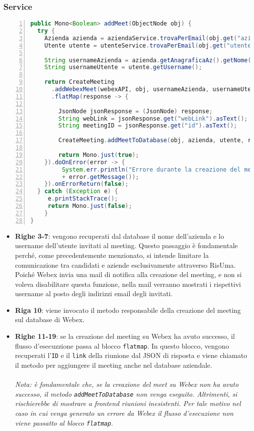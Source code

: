 \subsubsection{Service}
\begin{lstlisting}[language=java, frame=lines, basicstyle=\ttfamily\scriptsize, numbers=left]
public Mono<Boolean> addMeet(ObjectNode obj) {
  try {
    Azienda azienda = aziendaService.trovaPerEmail(obj.get("azienda").asText());
    Utente utente = utenteService.trovaPerEmail(obj.get("utente").asText());

    String usernameAzienda = azienda.getAnagraficaAz().getNome();
    String usernameUtente = utente.getUsername();

    return CreateMeeting
      .addWebexMeet(webexAPI, obj, usernameAzienda, usernameUtente)
      .flatMap(response -> {

	    JsonNode jsonResponse = (JsonNode) response;
	    String webLink = jsonResponse.get("webLink").asText();
	    String meetingID = jsonResponse.get("id").asText();

	    CreateMeeting.addMeetToDatabase(obj, azienda, utente, repo, webLink, meetingID);

	    return Mono.just(true);
    }).doOnError(error -> {
         System.err.println("Errore durante la creazione del meeting su Webex: "
         + error.getMessage());
    }).onErrorReturn(false);
  } catch (Exception e) {
     e.printStackTrace();
     return Mono.just(false);
    }
}
\end{lstlisting}
\begin{itemize}
    \item \textbf{Righe 3-7}: vengono recuperati dal database il nome dell'azienda e lo username dell'utente invitati al meeting. 
    Questo passaggio è fondamentale perché, come precedentemente menzionato, si intende limitare la comunicazione tra candidati 
    e aziende esclusivamente attraverso RisUma. Poiché Webex invia una mail di notifica alla creazione del meeting, e non si voleva
    disabilitare questa funzione, nella mail verranno mostrati i rispettivi username al posto degli indirizzi email degli invitati.

    \item \textbf{Riga 10}: viene invocato il metodo responsabile della creazione del meeting sul database di Webex.

    \item \textbf{Righe 11-19}: se la creazione del meeting su Webex ha avuto successo, il flusso d'esecuzzione passa al 
    blocco \texttt{flatmap}. In questo blocco, vengono recuperati l'\texttt{ID} e il \texttt{link} della riunione dal JSON di risposta 
    e viene chiamato il metodo per aggiungere il meeting anche nel database aziendale.
    \\
    \\
    \textit{Nota: è fondamentale che, se la creazione del meet su Webex non ha avuto successo, il metodo
    \texttt{addMeetToDatabase} non venga eseguito. Altrimenti, si rischierebbe di mostrare a frontend riunioni inesistenti.
    Per tale motivo nel caso in cui venga generato un errore da Webex il flusso d'esecuzione non viene passatto al blocco \texttt{flatmap}}.
\end{itemize}